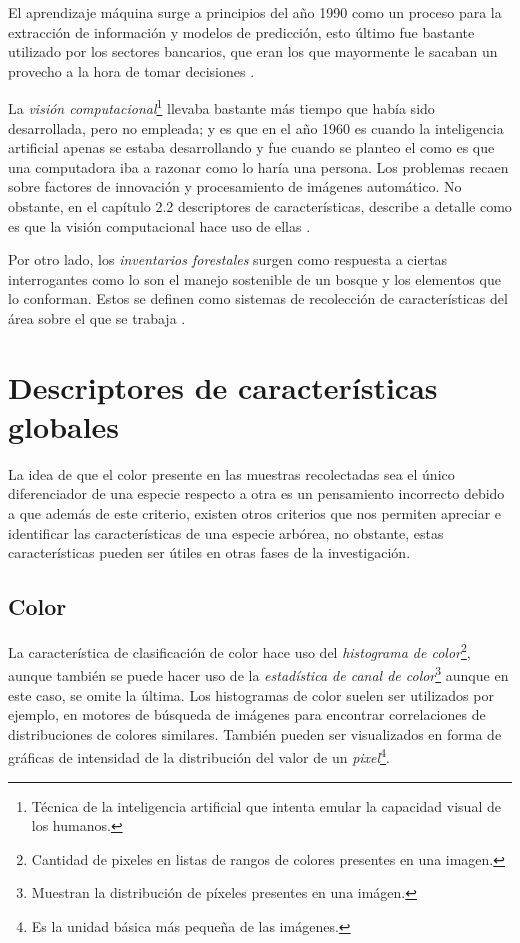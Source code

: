 El aprendizaje máquina surge a principios del año 1990 como un proceso para la extracción de información y modelos de predicción, esto último fue bastante utilizado por los sectores bancarios, que eran los que mayormente le sacaban un provecho a la hora de tomar decisiones \citep{rf5}. 

La \emph{visión computacional}\footnote{Técnica de la inteligencia artificial que intenta emular la capacidad visual de los humanos.} llevaba bastante más tiempo que había sido desarrollada, pero no empleada; y es que en el año 1960 es cuando la inteligencia artificial apenas se estaba desarrollando y fue cuando se planteo el como es que una computadora iba a razonar como lo haría una persona. Los problemas recaen sobre factores de innovación y procesamiento de imágenes automático. No obstante, en el capítulo 2.2 descriptores de características, describe a detalle como es que la visión computacional hace uso de ellas \citep{rf6}.

Por otro lado, los \emph{inventarios forestales} surgen como respuesta a ciertas interrogantes como lo son el manejo sostenible de un bosque y los elementos que lo conforman. Estos se definen como sistemas de recolección de características del área sobre el que se trabaja \citep{rf7}.

\section{Descriptores de características globales}
La idea de que el color presente en las muestras recolectadas sea el único diferenciador de una especie respecto a otra es un pensamiento incorrecto debido a que además de este criterio, existen otros criterios que nos permiten apreciar e identificar las características de una especie arbórea, no obstante, estas características pueden ser útiles en otras fases de la investigación. 

\subsection{Color}
La característica de clasificación de color hace uso del \emph{histograma de color}\footnote{Cantidad de pixeles en listas de rangos de colores presentes en una imagen.}, aunque también se puede hacer uso de la \emph{estadística de canal de color}\footnote{Muestran la distribución de píxeles presentes en una imágen.} aunque en este caso, se omite la última. Los histogramas de color suelen ser utilizados por ejemplo, en motores de búsqueda de imágenes para encontrar correlaciones de distribuciones de colores similares. También pueden ser visualizados en forma de gráficas de intensidad de la distribución del valor de un \emph{pixel}\footnote{Es la unidad básica más pequeña de las imágenes.}.


